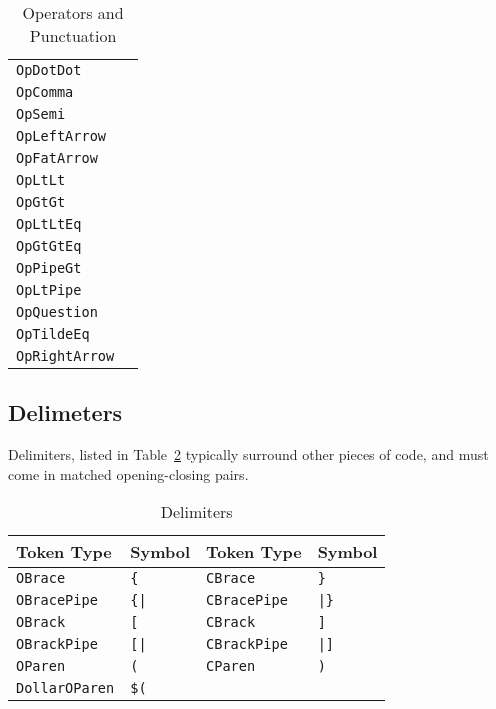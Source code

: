 \begin{table}[h]
{\begin{tabular}[t]{ll}
        \texttt{OpDotDot} & \op{..} \\
        \texttt{OpComma} & \op{,} \\
        \texttt{OpSemi} & \op{;} \\
        \texttt{OpLeftArrow} & \op{<-} \\
        \texttt{OpFatArrow} & \op{=>} \\
        \hline
        \texttt{OpLtLt} & \op{<<} \\
        \texttt{OpGtGt} & \op{>>} \\
        \texttt{OpLtLtEq} & \op{<<=} \\
        \texttt{OpGtGtEq} & \op{>>=} \\
        \texttt{OpPipeGt} & \op{|>} \\
        \texttt{OpLtPipe} & \op{<|} \\
        \hline
        \texttt{OpQuestion} & \op{?} \\
        \texttt{OpTildeEq} & \op{\textasciitilde=} \\
        \texttt{OpRightArrow} & \op{->} \\
        \hline
    \end{tabular}
}
\caption{\label{tab:operators}Operators and Punctuation}
\end{table}

\subsection{Delimeters}

Delimiters, listed in Table~\ref{tab:delimiters} typically surround other
pieces of code, and must come in matched opening-closing pairs.

\begin{table}[h]
    \centering
    \begin{tabular}[t]{llll}
        \hline
        \textbf{Token Type} & \textbf{Symbol}& \textbf{Token Type} & \textbf{Symbol} \\
        \hline
        \texttt{OBrace} & \texttt{\{}& \texttt{CBrace} & \texttt{\}} \\
        \texttt{OBracePipe} & \texttt{\{|}& \texttt{CBracePipe} & \texttt{|\}} \\
        \texttt{OBrack} & \texttt{[} & \texttt{CBrack} & \texttt{]} \\
        \texttt{OBrackPipe} & \texttt{[|}& \texttt{CBrackPipe} & \texttt{|]} \\
        \texttt{OParen} & \texttt{(} & \texttt{CParen} & \texttt{)} \\
        \texttt{DollarOParen} & \texttt{\$(} & & \\ %
        \hline
    \end{tabular}
    \caption{\label{tab:delimiters}Delimiters}
\end{table}


